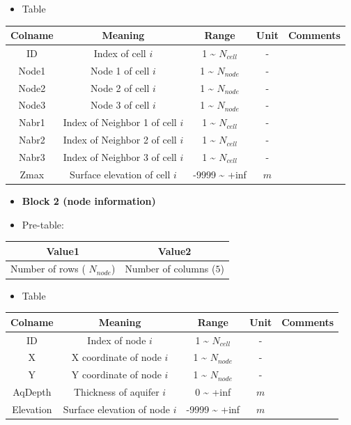 \documentclass[
]{scrbook}
\providecommand{\tightlist}{%
  \setlength{\itemsep}{0pt}\setlength{\parskip}{0pt}}
\begin{document}
\begin{itemize}
\tightlist
\item
  Table
\end{itemize}

\begin{longtable}[]{@{}ccccc@{}}
\toprule
Colname & Meaning & Range & Unit & Comments\tabularnewline
\midrule
\endhead
ID & Index of cell \(i\) & 1 \textasciitilde{} \(N_{cell}\) & - &\tabularnewline
Node1 & Node 1 of cell \(i\) & 1 \textasciitilde{} \(N_{node}\) & - &\tabularnewline
Node2 & Node 2 of cell \(i\) & 1 \textasciitilde{} \(N_{node}\) & - &\tabularnewline
Node3 & Node 3 of cell \(i\) & 1 \textasciitilde{} \(N_{node}\) & - &\tabularnewline
Nabr1 & Index of Neighbor 1 of cell \(i\) & 1 \textasciitilde{} \(N_{cell}\) & - &\tabularnewline
Nabr2 & Index of Neighbor 2 of cell \(i\) & 1 \textasciitilde{} \(N_{cell}\) & - &\tabularnewline
Nabr3 & Index of Neighbor 3 of cell \(i\) & 1 \textasciitilde{} \(N_{cell}\) & - &\tabularnewline
Zmax & Surface elevation of cell \(i\) & -9999 \textasciitilde{} +inf & \(m\) &\tabularnewline
\bottomrule
\end{longtable}

\begin{itemize}
\item
  \textbf{Block 2 (node information)}
\item
  Pre-table:
\end{itemize}

\begin{longtable}[]{@{}cc@{}}
\toprule
Value1 & Value2\tabularnewline
\midrule
\endhead
Number of rows ( \(N_{node}\)) & Number of columns (\(5\))\tabularnewline
\bottomrule
\end{longtable}

\begin{itemize}
\tightlist
\item
  Table
\end{itemize}

\begin{longtable}[]{@{}ccccc@{}}
\toprule
Colname & Meaning & Range & Unit & Comments\tabularnewline
\midrule
\endhead
ID & Index of node \(i\) & 1 \textasciitilde{} \(N_{cell}\) & - &\tabularnewline
X & X coordinate of node \(i\) & 1 \textasciitilde{} \(N_{node}\) & - &\tabularnewline
Y & Y coordinate of node \(i\) & 1 \textasciitilde{} \(N_{node}\) & - &\tabularnewline
AqDepth & Thickness of aquifer \(i\) & 0 \textasciitilde{} +inf & \(m\) &\tabularnewline
Elevation & Surface elevation of node \(i\) & -9999 \textasciitilde{} +inf & \(m\) &\tabularnewline
\bottomrule
\end{longtable}
\end{document}

